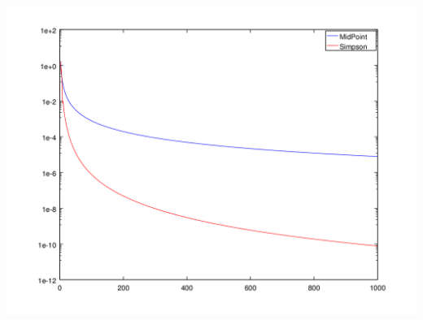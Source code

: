 \documentclass[12pt,a4paper,hidelinks,fleqn]{article}            %
\begin{document}
\begin{center}
\includegraphics[scale=0.7]{quadrature}
\end{center}
\end{document}
